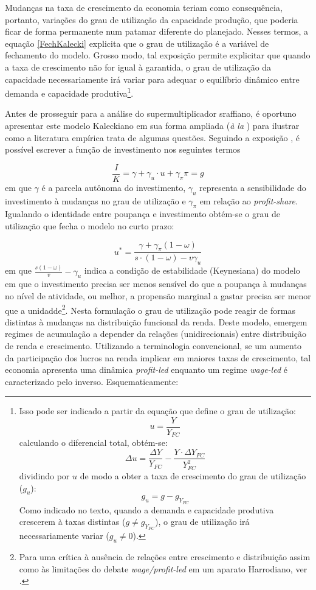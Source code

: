 Mudanças na taxa de crescimento da economia teriam como consequência, portanto, variações do grau de utilização da capacidade produção, que poderia ficar de forma permanente num patamar diferente do planejado.
Nesses termos, a equação \ref{FechKalecki} explicita que o grau de utilização é a variável de fechamento do modelo. Grosso modo, tal exposição permite explicitar que quando a taxa de crescimento não for igual à garantida, o grau de utilização da capacidade necessariamente irá variar para adequar o equilíbrio dinâmico entre demanda e capacidade produtiva\footnote{Isso pode ser indicado a partir da equação que define o grau de utilização:
$$
u = \frac{Y}{Y_{FC}}
$$
calculando o diferencial total, obtém-se:
$$
\Delta u = \frac{\Delta Y}{ Y_{FC}} - \frac{Y\cdot \Delta Y_{FC}}{Y_{FC}^2}
$$
dividindo por $u$ de modo a obter a taxa de crescimento do grau de utilização ($g_u$):
$$
g_u = g - g_{Y_{FC}}
$$
Como indicado no texto, quando a demanda e capacidade produtiva crescerem à taxas distintas ($g \neq g_{Y_{FC}}$), o grau de utilização irá necessariamente variar ($g_u \neq 0$).
}.

Antes de prosseguir para a análise do supermultiplicador sraffiano, é oportuno apresentar este modelo Kaleckiano em sua forma ampliada (\textit{à la} \textcite{bhaduri_unemployment_1990}) para ilustrar como a literatura empírica trata de algumas questões. Seguindo a exposição \textcite[Cap, 6]{lavoie_post-keynesian_2015}, é possível escrever a função de investimento nos seguintes termos

\begin{equation}
\label{PostKalecki}
\frac{I}{K} = \gamma + \gamma_u\cdot u + \gamma_{\pi}\pi = g
\end{equation}
em que $\gamma$ é a parcela autônoma do investimento, $\gamma_u$ representa a sensibilidade do investimento à mudanças no grau de utilização e $\gamma_{\pi}$ em relação ao \textit{profit-share}. Igualando o identidade entre poupança e investimento obtém-se o grau de utilização que fecha o modelo no curto prazo:

\begin{equation}
\label{KaleckiSR}
    u^{*} = \frac{\gamma + \gamma_{\pi}(1-\omega)}{s\cdot (1-\omega) - v\gamma_u}
\end{equation}
em que $\frac{s(1-\omega)}{v} - \gamma_u$ indica a condição de estabilidade (Keynesiana) do modelo em que o investimento precisa ser menos sensível do que a poupança à mudanças no nível de atividade, ou melhor, a propensão marginal a gastar precisa ser menor que a unidadde\footnote{Para uma crítica à ausência de relações entre crescimento e distribuição assim como às limitações do debate \textit{wage/profit-led} em um aparato
Harrodiano, 
ver 
\textcite{skott_weaknesses_2017}.}.
Nesta formulação o grau de utilização pode reagir de formas distintas à mudanças na distribuição funcional da renda. Deste modelo, emergem regimes de acumulação a depender da relações (unidirecionais) entre distribuição de renda e crescimento. Utilizando a terminologia convencional, se um aumento da participação dos lucros na renda implicar em maiores taxas de crescimento, tal economia apresenta uma dinâmica \textit{profit-led} enquanto um regime \textit{wage-led} é caracterizado pelo inverso. Esquematicamente:

